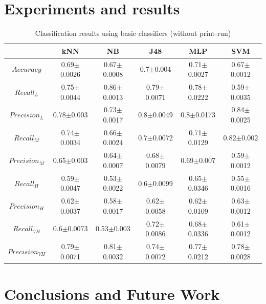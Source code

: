 \documentclass{llncs}
\begin{document}
\section{Experiments and results}







\begin{table}
\caption{Classification results using basic classifiers (without print-run)}
\centering{}%
\begin{tabular}{|c|c|c|c|c|c|}
\hline 
 & kNN  & NB  & J48  & MLP  & SVM\tabularnewline
\hline 
\hline 
$Accuracy$  & 0.69$\pm$0.0026 & 0.67$\pm$0.0008 & 0.7$\pm$0.004 & 0.71$\pm$0.0027 & 0.67$\pm$0.0012\tabularnewline
\hline 
\hline 
$Recall_{L}$  & 0.75$\pm$0.0044 & 0.86$\pm$0.0013 & 0.79$\pm$0.0071 & 0.78$\pm$0.0222 & 0.59$\pm$0.0035\tabularnewline
\hline 
$Precision_{L}$  & 0.78$\pm$0.003 & 0.73$\pm$0.0017 & 0.8$\pm$0.0049 & 0.8$\pm$0.0173 & 0.84$\pm$0.0025\tabularnewline
\hline 
\hline 
$Recall_{M}$  & 0.74$\pm$0.0034 & 0.66$\pm$0.0024 & 0.7$\pm$0.0072 & 0.71$\pm$0.0129 & 0.82$\pm$0.002\tabularnewline
\hline 
$Precision_{M}$  & 0.65$\pm$0.003 & 0.64$\pm$0.0007 & 0.68$\pm$0.0079 & 0.69$\pm$0.007 & 0.59$\pm$0.0012\tabularnewline
\hline 
\hline 
$Recall_{H}$  & 0.59$\pm$0.0047 & 0.53$\pm$0.0022 & 0.6$\pm$0.0099 & 0.65$\pm$0.0346 & 0.55$\pm$0.0016\tabularnewline
\hline 
$Precision_{H}$  & 0.62$\pm$0.0037 & 0.58$\pm$0.0017 & 0.62$\pm$0.0058 & 0.62$\pm$0.0109 & 0.63$\pm$0.0012\tabularnewline
\hline 
\hline 
$Recall_{VH}$  & 0.6$\pm$0.0073 & 0.53$\pm$0.003 & 0.72$\pm$0.0086 & 0.68$\pm$0.0336 & 0.61$\pm$0.0012\tabularnewline
\hline 
$Precision_{VH}$  & 0.79$\pm$0.0071 & 0.81$\pm$0.0032 & 0.74$\pm$0.0072 & 0.77$\pm$0.0212 & 0.78$\pm$0.0028\tabularnewline
\hline 
\end{tabular}
\end{table}

\section{Conclusions and Future Work}
\label{sec:conclusionsAndFutureWork}
\end{document}
